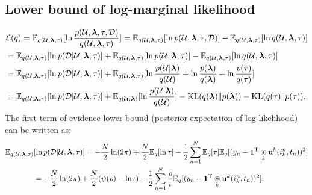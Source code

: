 \subsection{Lower bound of log-marginal likelihood}
\label{ap:A.2}
\begin{equation}
\begin{split}
    &\mathcal{L}(q) = \mathbb{E}_{q(\mathcal{U}, \boldsymbol{\lambda}, \tau)}[\ln \frac{p(\mathcal{U}, \boldsymbol{\lambda}, \tau, \mathcal{D})}{q(\mathcal{U}, \boldsymbol{\lambda}, \tau)}] = \mathbb{E}_{q(\mathcal{U}, \boldsymbol{\lambda}, \tau)}[\ln p(\mathcal{U}, \boldsymbol{\lambda}, \tau, \mathcal{D})] - \mathbb{E}_{q(\mathcal{U}, \boldsymbol{\lambda}, \tau)}[\ln q(\mathcal{U}, \boldsymbol{\lambda}, \tau)]\\
    &=\mathbb{E}_{q(\mathcal{U}, \boldsymbol{\lambda}, \tau)}[\ln p(\mathcal{D}|\mathcal{U}, \boldsymbol{\lambda}, \tau)] + \mathbb{E}_{q(\mathcal{U}, \boldsymbol{\lambda}, \tau)}[\ln p(\mathcal{U}, \boldsymbol{\lambda}, \tau)] - \mathbb{E}_{q(\mathcal{U}, \boldsymbol{\lambda}, \tau)}[\ln q(\mathcal{U}, \boldsymbol{\lambda}, \tau)]\\
    &=\mathbb{E}_{q(\mathcal{U}, \boldsymbol{\lambda}, \tau)}[\ln p(\mathcal{D}|\mathcal{U}, \boldsymbol{\lambda}, \tau)]+  \mathbb{E}_{q(\mathcal{U}, \boldsymbol{\lambda}, \tau)}[\ln 
    \frac{p(\mathcal{U}|\boldsymbol{\lambda})}{q(\mathcal{U})} + \ln 
    \frac{p(\boldsymbol{\lambda})}{q(\boldsymbol{\lambda})} + \ln 
    \frac{p(\tau)}{q(\tau)}]\\
    &=\mathbb{E}_{q(\mathcal{U}, \boldsymbol{\lambda}, \tau)}[\ln p(\mathcal{D}|\mathcal{U}, \boldsymbol{\lambda}, \tau)]+\mathbb{E}_{q(\mathcal{U}, \boldsymbol{\lambda})}[\ln 
    \frac{p(\mathcal{U}|\boldsymbol{\lambda})}{q(\mathcal{U})}]  - \text{KL}(q(\boldsymbol{\lambda})\|p(\boldsymbol{\lambda})) - \text{KL}(q(\tau)\|p(\tau)).
\end{split}
\end{equation}
The first term of evidence lower bound (posterior expectation of log-likelihood) can be written as:
\begin{equation}
    \begin{split}
        \mathbb{E}_{q(\mathcal{U}, \boldsymbol{\lambda}, \tau)}&[\ln p(\mathcal{D}|\mathcal{U}, \boldsymbol{\lambda}, \tau)] = -\frac{N}{2}\ln(2\pi) + \frac{N}{2}\mathbb{E}_q[\ln\tau]-\frac{1}{2}\sum_{n=1}^{N}\mathbb{E}_q[\tau]\mathbb{E}_q[(y_n-\boldsymbol{1}^{\mathrm{T}}\underset{k}{\circledast} \mathbf{u}^k(i_k^n,t_n))^2]\\
        &=-\frac{N}{2}\ln(2\pi) + \frac{N}{2}(\psi(\rho)-\ln\iota)-\frac{1}{2}\sum_{n=1}^{N}\frac{\rho}{\iota}\mathbb{E}_q[(y_n-\boldsymbol{1}^{\mathrm{T}}\underset{k}{\circledast} \mathbf{u}^k(i_k^n,t_n))^2],
    \end{split}
\end{equation}
